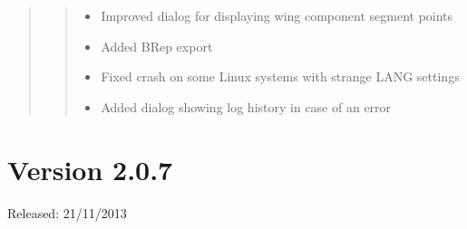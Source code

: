 \documentclass[]{scrartcl}
\begin{document}
\begin{quote}
\begin{itemize}
  \begin{quote}
  \begin{itemize}
  \itemsep1pt\parskip0pt
  \item
    Improved dialog for displaying wing component segment points
  \item
    Added BRep export
  \item
    Fixed crash on some Linux systems with strange LANG settings
  \item
    Added dialog showing log history in case of an error
  \end{itemize}
  \end{quote}
\end{itemize}
\end{quote}

\section{Version 2.0.7}

Released: 21/11/2013
\end{document}
